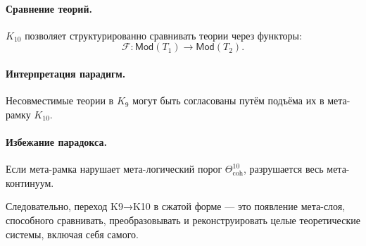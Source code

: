 \paragraph{Сравнение теорий.}
$K_{10}$ позволяет структурированно сравнивать теории через функторы:
\[
\mathcal{F} : \mathsf{Mod}(T_1) \rightarrow \mathsf{Mod}(T_2).
\]

\paragraph{Интерпретация парадигм.}
Несовместимые теории в $K_9$ могут быть согласованы путём подъёма их в
мета-рамку $K_{10}$.

\paragraph{Избежание парадокса.}
Если мета-рамка нарушает мета-логический порог
$\Theta^{10}_{\mathrm{coh}}$, разрушается весь мета-континуум.

Следовательно, переход K9→K10 в сжатой форме — это
появление мета-слоя, способного сравнивать, преобразовывать и реконструировать
целые теоретические системы, включая себя самого.
